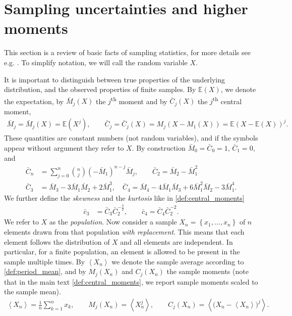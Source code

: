\documentclass[12pt,a4paper]{article}
\renewcommand{\|}{\rule[-0.4ex]{0.2ex}{1.2em}}
\begin{document}
\section{Sampling uncertainties and higher moments}\label{sec:sampling_uncertainty}

This section is a review of basic facts of sampling statistics, for more details see e.g.  \cite{shenton_development_1975,davison_bootstrap_1997,tille_sampling_2020,evans_probability_2023}. To simplify notation, we will call the random variable $X$. 

It is important to distinguish between true properties of the underlying distribution, and the observed properties of finite samples. By $\mathbb E(X)$, we denote the  expectation,  by $\bar M_j(X)$ the   $j$\textsuperscript{th} moment and by $\bar C_j(X)$ the   $j$\textsuperscript{th}  central moment,
\begin{align*}
	\bar M_j=\bar M_j(X) = \mathbb{E}\left( X^j \right)  , \qquad \bar C_j =\bar C_j(X)=  M_j \left( X-M_1(X) \right)  = \mathbb E \left( X -\mathbb E(X)\right) ^j.
\end{align*}
These quantities are constant numbers (not random variables), and if the symbols appear without argument they refer to  $X$. 
By construction $\bar M_0 = \bar C_0=1$, $\bar C_1=0$, and
\begin{align}\label{moments_central_moments}
	\bar C_n &= \sum_{j=0}^n \binom n j (- \bar M_1)^{n-j} \bar M_j, \qquad \bar C_2  = \bar M_2-\bar M_1^2\\
	  \bar C_3 &= \bar M_3 - 3 \bar M_1 \bar M_2 + 2 \bar M_1^3, \quad \bar C_4 = \bar M_4 - 4 \bar M_1 \bar M_3 + 6 \bar M_1^2 \bar M_2 - 3 \bar M_1^4.\nonumber 
\end{align}
We further define the \emph{skewness} and the \emph{kurtosis} like in \cref{def:central_moments}
\begin{align}\label{def:skewness_kurtosis}
	\bar c_3 &= \bar C_3 \bar C_2^{-\frac 3 2}, \qquad \bar c_4 = \bar C_4 \bar C_2^{-2}.
\end{align}
We refer to $X$ as the \emph{population}. 
Now consider a sample $X_n=\left \lbrace x_1, \ldots, x_n \right \rbrace $ of $n$ elements drawn from that population \emph{with replacement}. This means that each element follows the distribution of $X$ and all elements are independent. In particular, for a finite population, an element is allowed to be present in the sample multiple times.  By $\left \langle X_n \right \rangle $ we denote the sample average according to \cref{def:period_mean}, and by $M_j(X_n)$ and $C_j(X_n)$ the sample moments (note that in the main text \cref{def:central_moments}, we report sample moments scaled to the sample mean).
\begin{align}\label{def:sample_mean}
	\left \langle X_n \right \rangle = \frac 1 n \sum_{k=1}^n x_k, \qquad M_j(X_n) = \left \langle X_n^j \right \rangle , \qquad C_j(X_n) =  \left \langle \big(X_n- \left \langle X_n \right \rangle  \big)^j \right \rangle  .
\end{align}
\end{document}
